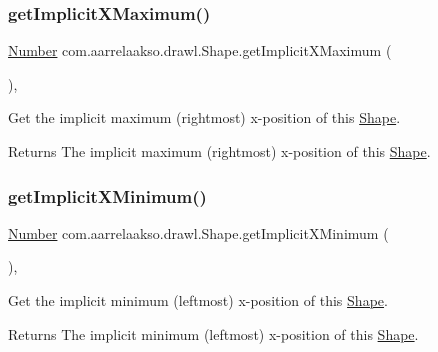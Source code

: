 \subsubsection{\texorpdfstring{get\+Implicit\+X\+Maximum()}{getImplicitXMaximum()}}
{\footnotesize\ttfamily \hyperlink{interfacecom_1_1aarrelaakso_1_1drawl_1_1_number}{Number} com.\+aarrelaakso.\+drawl.\+Shape.\+get\+Implicit\+X\+Maximum (\begin{DoxyParamCaption}{ }\end{DoxyParamCaption})\hspace{0.3cm}{\ttfamily [protected]}, {\ttfamily [inherited]}}



Get the implicit maximum (rightmost) x-\/position of this \hyperlink{classcom_1_1aarrelaakso_1_1drawl_1_1_shape}{Shape}. 

\begin{DoxyReturn}{Returns}
The implicit maximum (rightmost) x-\/position of this \hyperlink{classcom_1_1aarrelaakso_1_1drawl_1_1_shape}{Shape}. 
\end{DoxyReturn}
\mbox{\label{classcom_1_1aarrelaakso_1_1drawl_1_1_shape_a264da8a94218b09267c2e177ff0b0951}} 
\subsubsection{\texorpdfstring{get\+Implicit\+X\+Minimum()}{getImplicitXMinimum()}}
{\footnotesize\ttfamily \hyperlink{interfacecom_1_1aarrelaakso_1_1drawl_1_1_number}{Number} com.\+aarrelaakso.\+drawl.\+Shape.\+get\+Implicit\+X\+Minimum (\begin{DoxyParamCaption}{ }\end{DoxyParamCaption})\hspace{0.3cm}{\ttfamily [protected]}, {\ttfamily [inherited]}}



Get the implicit minimum (leftmost) x-\/position of this \hyperlink{classcom_1_1aarrelaakso_1_1drawl_1_1_shape}{Shape}. 

\begin{DoxyReturn}{Returns}
The implicit minimum (leftmost) x-\/position of this \hyperlink{classcom_1_1aarrelaakso_1_1drawl_1_1_shape}{Shape}. 
\end{DoxyReturn}
\mbox{\label{classcom_1_1aarrelaakso_1_1drawl_1_1_shape_a9632097be62eb03e09145763852bda85}} 
